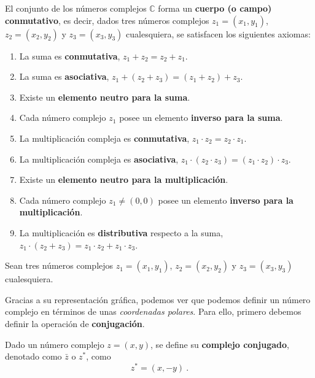 \begin{teorema}
    El conjunto de los números complejos $\mathbb{C}$ forma un \textbf{cuerpo (o campo) conmutativo}, es decir, dados tres números complejos $z_1 = (x_1, y_1)$, $z_2 = (x_2, y_2)$ y $z_3 = (x_3, y_3)$ cualesquiera, se satisfacen los siguientes axiomas:
    \begin{enumerate}
        \item La suma es \textbf{conmutativa}, $z_1 + z_2 = z_2 + z_1$.
        \item La suma es \textbf{asociativa}, $z_1 + (z_2 + z_3) = (z_1 + z_2) + z_3$.
        \item Existe un \textbf{elemento neutro para la suma}.
        \item Cada número complejo $z_1$ posee un elemento \textbf{inverso para la suma}.
        \item La multiplicación compleja es \textbf{conmutativa}, $z_1 \cdot z_2 = z_2 \cdot z_1$.
        \item La multiplicación compleja es \textbf{asociativa}, $z_1 \cdot (z_2 \cdot z_3) = (z_1 \cdot z_2) \cdot z_3$.
        \item Existe un \textbf{elemento neutro para la multiplicación}.
        \item Cada número complejo $z_1 \neq (0,0)$ posee un elemento \textbf{inverso para la multiplicación}.
        \item La multiplicación es \textbf{distributiva} respecto a la suma, $z_1 \cdot (z_2 + z_3) = z_1 \cdot z_2 + z_1 \cdot z_3$.
    \end{enumerate}
\end{teorema}

\begin{demo}
    Sean tres números complejos $z_1 = (x_1, y_1)$, $z_2 = (x_2, y_2)$ y $z_3 = (x_3, y_3)$ cualesquiera.
\end{demo}

Gracias a su representación gráfica, podemos ver que podemos definir un número complejo en términos de unas \emph{coordenadas polares}. Para ello, primero debemos definir la operación de \textbf{conjugación}.

\begin{defi}
    Dado un número complejo $z = (x,y)$, se define su \textbf{complejo conjugado}, denotado como $\bar{z}$ o $z^\ast$, como
    \begin{equation}
        z^\ast = (x, -y) \ .
    \end{equation}
\end{defi}

